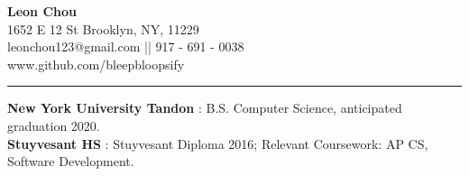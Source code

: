 \documentclass[11pt, letter, sans]{moderncv}
\begin{document}
  \makecvtitle
  \begin{center}
    \textbf{{\LARGE Leon Chou}}\\
    1652 E 12 St Brooklyn, NY, 11229 \\
    leonchou123@gmail.com || 917 - 691 - 0038\\ www.github.com/bleepbloopsify\\
  \end{center}
  \vspace{0.1cm} \hrule \vspace{0.2cm}
  \noindent\textbf{New York University Tandon} : B.S. Computer Science, anticipated graduation 2020.\\
  \textbf{Stuyvesant HS} : Stuyvesant Diploma 2016;
  Relevant Coursework: AP CS, Software Development.
\end{document}
